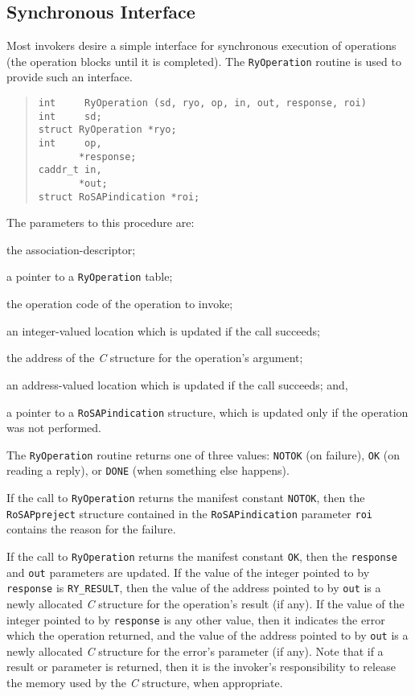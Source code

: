 \subsection*	{Synchronous Interface}
Most invokers desire a simple interface for synchronous execution
of operations (the operation blocks until it is completed).
The \verb"RyOperation" routine is used to provide such an interface.
\begin{quote}\small\begin{verbatim}
int     RyOperation (sd, ryo, op, in, out, response, roi)
int     sd;
struct RyOperation *ryo;
int     op,
       *response;
caddr_t in,
       *out;
struct RoSAPindication *roi;
\end{verbatim}\end{quote}
The parameters to this procedure are:
\begin{describe}
\item[\verb"sd":] the association-descriptor;

\item[\verb"ryo":] a pointer to a \verb"RyOperation" table;

\item[\verb"op":] the operation code of the operation to invoke;

\item[\verb"response":] an integer-valued location which is updated if the
call succeeds;

\item[\verb"in":] the address of the {\em C\/} structure for the operation's
argument;

\item[\verb"out":] an address-valued location which is updated if the call
succeeds;
and,

\item[\verb"roi":] a pointer to a \verb"RoSAPindication" structure,
which is updated only if the operation was not performed.
\end{describe}
The \verb"RyOperation" routine returns one of three values:
\verb"NOTOK" (on failure),
\verb"OK" (on reading a reply),
or
\verb"DONE" (when something else happens).

If the call to \verb"RyOperation" returns the manifest constant \verb"NOTOK",
then the \verb"RoSAPpreject" structure contained in
the \verb"RoSAPindication" parameter
\verb"roi" contains the reason for the failure.

If the call to \verb"RyOperation" returns the manifest constant \verb"OK",
then the \verb"response" and \verb"out" parameters are updated.
If the value of the integer pointed to by \verb"response" is \verb"RY_RESULT",
then the value of the address pointed to by \verb"out" is a newly allocated
{\em C\/} structure for the operation's result (if any).
If the value of the integer pointed to by \verb"response" is any other value,
then it indicates the error which the operation returned,
and the value of the address pointed to by \verb"out" is a newly allocated
{\em C\/} structure for the error's parameter (if any).
Note that if a result or parameter is returned,
then it is the invoker's responsibility to release the memory used by the
{\em C\/} structure, when appropriate.

